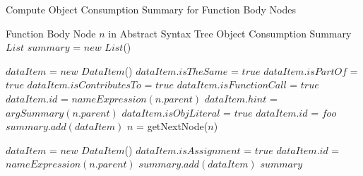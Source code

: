 \documentclass[10pt, preprint]{sigplanconf}
\begin{document}
\begin{algorithm}                      %
\caption{Compute Object Consumption Summary for Function Body Nodes}          %
\label{alg1}                           %
\begin{algorithmic}                    %
\REQUIRE Function Body Node $n$ in Abstract Syntax Tree
\ENSURE Object Consumption Summary 
\STATE $List$ $summary$ = $new$ $List$()


	\STATE $dataItem$ = $new$ $DataItem$()
    	 \STATE $dataItem.isTheSame$ = $true$
    		\STATE $dataItem.isPartOf$ = $true$
    \ELSE	
	   		\STATE $dataItem.isContributesTo$ = $true$
    \ENDIF
   	    \STATE $dataItem.isFunctionCall$ = $true$
   	    \STATE $dataItem.id$ = $nameExpression(n.parent)$
   	    \STATE $dataItem.hint$ = $argSummary(n.parent)$
   	    \STATE $dataItem.isObjLiteral$ = $true$
   	    \STATE $dataItem.id$ = $foo$
    \ENDIF     
   \STATE $summary.add(dataItem)$
   \STATE $n$ = getNextNode($n$)
\ENDWHILE 
 
  	\STATE $dataItem$ = $new$ $DataItem$()
		\STATE $dataItem.isAssignment$ = $true$
    \STATE $dataItem.id$ = $nameExpression(n.parent)$
    \STATE $summary.add(dataItem)$
  \ENDIF	
  \RETURN $summary$
\end{algorithmic}
\end{algorithm}
\end{document}
